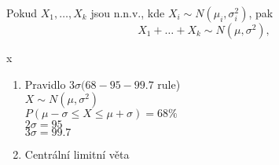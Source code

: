 \documentclass[../main.tex]{subfiles}
\begin{document}
\begin{remark}
    Pokud $X_1,\dots,X_k$ jsou n.n.v., kde $X_i \sim N(\mu_i, \sigma^2_i)$, pak
    \[X_1 + \dots + X_k \sim N(\mu, \sigma^2),\]
\end{remark}

\begin{remark}
    {\color{white} x}

    \begin{enumerate}
        \item Pravidlo $3\sigma (68-95-99.7$ rule)\\
        $X \sim N(\mu, \sigma^2)$\\
        $P(\mu-\sigma \leq X \leq \mu + \sigma) = 68 \%$\\
        $2\sigma = 95$\\
        $3\sigma = 99.7$
        
        \item Centrální limitní věta
    \end{enumerate}
\end{remark}
\end{document}
